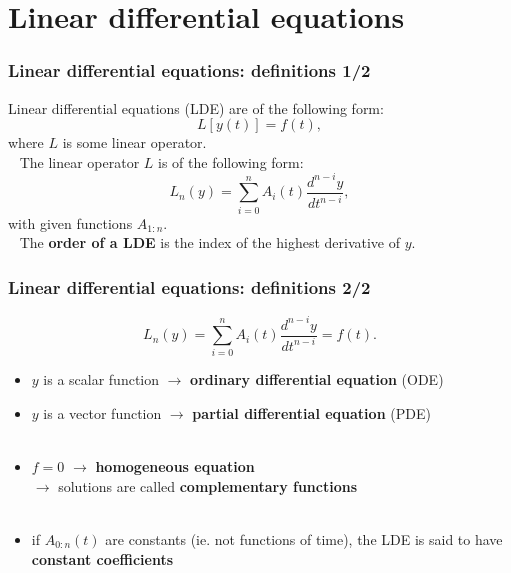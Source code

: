 \zbea
{}

\newif\ifpdf
\ifx\pdfoutput\undefined
\pdffalse
\else
{}
\pdftrue
\fi
\ifpdf

\else

\fi




\begin{frame}
\tableofcontents
\end{frame}

\section{Linear differential equations}

\begin{frame}
\frametitle{Linear differential equations: definitions 1/2}
Linear differential equations (LDE) are of the following form:
\begin{equation*}
L[y(t)] = f(t),
\end{equation*}
where $L$ is some linear operator. \\ \pause
\ \newline
The linear operator $L$ is of the following form:
\begin{equation*}
L_n(y) = \sum_{i=0}^{n} A_i(t) \frac{d^{n-i}y}{dt^{n-i}},
\end{equation*}
with given functions $A_{1:n}$.\\ \pause
\ \newline
The \textbf{order of a LDE} is the index of the highest derivative of $y$.
\end{frame}

\begin{frame}
\frametitle{Linear differential equations: definitions 2/2}
\begin{equation*}
L_n(y) = \sum_{i=0}^{n} A_i(t) \frac{d^{n-i}y}{dt^{n-i}} = f(t).
\end{equation*}
\begin{itemize}
\item $y$ is a scalar function $\rightarrow$ \textbf{ordinary differential equation} (ODE) \pause
\item $y$ is a vector function $\rightarrow$ \textbf{partial differential equation} (PDE) \\
\ \pause
\item $f = 0$ $\rightarrow$ \textbf{homogeneous equation} \\
$\rightarrow$ solutions are called \textbf{complementary functions} \\
\ \pause
\item if $A_{0:n}(t)$ are constants (ie. not functions of time), the LDE is said to have \textbf{constant coefficients}
\end{itemize}
\end{frame}

